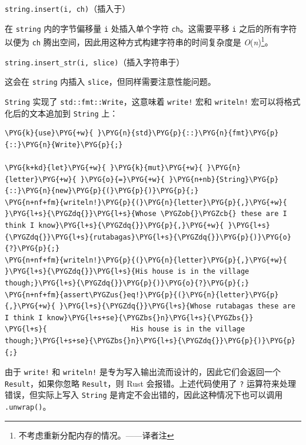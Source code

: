 \begin{mySidenote}
\texttt{string.insert(i, ch)}（插入于）
\end{mySidenote}

在 \texttt{string} 内的字节偏移量 \texttt{i} 处插入单个字符 \texttt{ch}。这需要平移 \texttt{i} 之后的所有字符以便为 \texttt{ch} 腾出空间，因此用这种方式构建字符串的时间复杂度是 \emph{O}(\emph{n})\footnote{不考虑重新分配内存的情况。——译者注}。

\begin{myNote}
\texttt{string.insert\_str(i, slice)}（插入字符串于）
\end{myNote}

这会在 \texttt{string} 内插入 \texttt{slice}，但同样需要注意性能问题。

\texttt{String} 实现了 \texttt{std::fmt::Write}，这意味着 \texttt{write!} 宏和 \texttt{writeln!} 宏可以将格式化后的文本追加到 \texttt{String} 上：

\begin{Verbatim}[commandchars=\\\{\},breaklines=true,breakanywhere=true,fontsize=\codefont,xleftmargin=17bp]
\PYG{k}{use}\PYG{+w}{ }\PYG{n}{std}\PYG{p}{::}\PYG{n}{fmt}\PYG{p}{::}\PYG{n}{Write}\PYG{p}{;}

\PYG{k+kd}{let}\PYG{+w}{ }\PYG{k}{mut}\PYG{+w}{ }\PYG{n}{letter}\PYG{+w}{ }\PYG{o}{=}\PYG{+w}{ }\PYG{n+nb}{String}\PYG{p}{::}\PYG{n}{new}\PYG{p}{(}\PYG{p}{)}\PYG{p}{;}
\PYG{n+nf+fm}{writeln!}\PYG{p}{(}\PYG{n}{letter}\PYG{p}{,}\PYG{+w}{ }\PYG{l+s}{\PYGZdq{}}\PYG{l+s}{Whose \PYGZob{}\PYGZcb{} these are I think I know}\PYG{l+s}{\PYGZdq{}}\PYG{p}{,}\PYG{+w}{ }\PYG{l+s}{\PYGZdq{}}\PYG{l+s}{rutabagas}\PYG{l+s}{\PYGZdq{}}\PYG{p}{)}\PYG{o}{?}\PYG{p}{;}
\PYG{n+nf+fm}{writeln!}\PYG{p}{(}\PYG{n}{letter}\PYG{p}{,}\PYG{+w}{ }\PYG{l+s}{\PYGZdq{}}\PYG{l+s}{His house is in the village though;}\PYG{l+s}{\PYGZdq{}}\PYG{p}{)}\PYG{o}{?}\PYG{p}{;}
\PYG{n+nf+fm}{assert\PYGZus{}eq!}\PYG{p}{(}\PYG{n}{letter}\PYG{p}{,}\PYG{+w}{ }\PYG{l+s}{\PYGZdq{}}\PYG{l+s}{Whose rutabagas these are I think I know}\PYG{l+s+se}{\PYGZbs{}n}\PYG{l+s}{\PYGZbs{}}
\PYG{l+s}{                    His house is in the village though;}\PYG{l+s+se}{\PYGZbs{}n}\PYG{l+s}{\PYGZdq{}}\PYG{p}{)}\PYG{p}{;}
\end{Verbatim}

由于 \texttt{write!} 和 \texttt{writeln!} 是专为写入输出流而设计的，因此它们会返回一个 \texttt{Result}，如果你忽略 \texttt{Result}，则 Rust 会报错。上述代码使用了 \texttt{?} 运算符来处理错误，但实际上写入 \texttt{String} 是肯定不会出错的，因此这种情况下也可以调用 \texttt{.unwrap()}。

